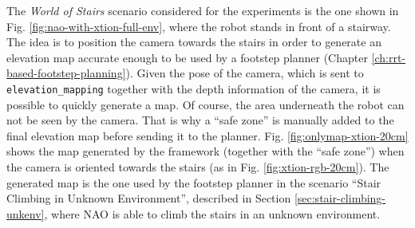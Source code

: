 The \textit{World of Stairs} scenario considered for the experiments is the one 
shown in Fig. \ref{fig:nao-with-xtion-full-env}, where the robot stands in 
front of a stairway. The idea is to position the camera towards the stairs in 
order to generate an elevation map accurate enough to be used by a footstep
planner (Chapter \ref{ch:rrt-based-footstep-planning}). Given the pose of the 
camera, which is sent to \texttt{elevation\_mapping} together with the depth 
information of the camera, it is possible to quickly generate a map.
Of course, the area underneath the robot can not be seen by the camera. That is 
why a ``safe zone'' is manually added to the final elevation map before 
sending it to the planner.
Fig. \ref{fig:onlymap-xtion-20cm} shows the map generated by the framework 
(together with the ``safe zone'') when the 
camera is oriented towards the stairs (as in Fig. \ref{fig:xtion-rgb-20cm}).
The generated map is the one used by the footstep planner in the scenario 
``Stair Climbing in Unknown Environment'', described in Section
\ref{sec:stair-climbing-unkenv}, where NAO is able to climb the stairs in an 
unknown environment.
